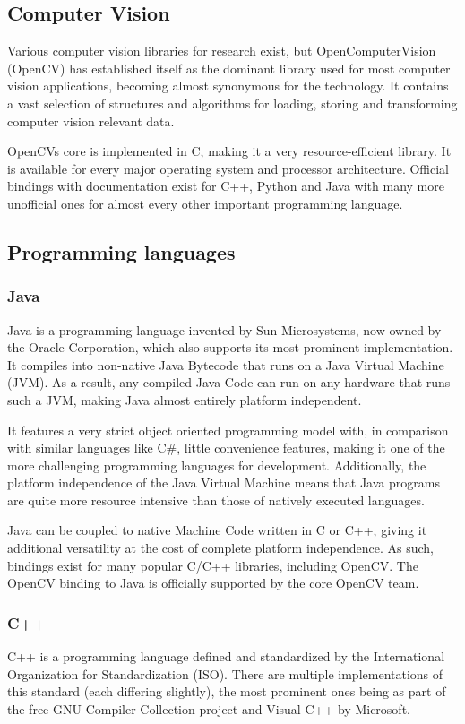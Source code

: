 \documentclass[BSA,Bachelor,english]{twbook}%
\begin{document}
\subsection{Computer Vision}

Various computer vision libraries for research exist, but OpenComputerVision (OpenCV) has established itself as the dominant library used for most computer vision applications, becoming almost synonymous for the technology. It contains a vast selection of structures and algorithms for loading, storing and transforming computer vision relevant data.

OpenCVs core is implemented in C, making it a very resource-efficient library. It is available for every major operating system and processor architecture. Official bindings with documentation exist for C++, Python and Java with many more unofficial ones for almost every other important programming language.

\subsection{Programming languages}
\subsubsection{Java}
Java\cite{JAVA} is a programming language invented by Sun Microsystems, now owned by the Oracle Corporation, which also supports its most prominent implementation. It compiles into non-native Java Bytecode that runs on a Java Virtual Machine (JVM). As a result, any compiled Java Code can run on any hardware that runs such a JVM, making Java almost entirely platform independent.

It features a very strict object oriented programming model with, in comparison with similar languages like C\#, little convenience features, making it one of the more challenging programming languages for development. Additionally, the platform independence of the Java Virtual Machine means that Java programs are quite more resource intensive than those of natively executed languages\cite{SPD_COMPARISON}.

Java can be coupled to native Machine Code written in C or C++, giving it additional versatility at the cost of complete platform independence. As such, bindings exist for many popular C/C++ libraries, including OpenCV. The OpenCV binding to Java is officially supported by the core OpenCV team.
\subsubsection{C++}
C++ is a programming language defined and standardized by the International Organization for Standardization (ISO)\cite{CPP}. There are multiple implementations of this standard (each differing slightly), the most prominent ones being as part of the free GNU Compiler Collection project and Visual C++ by Microsoft.
\end{document}
